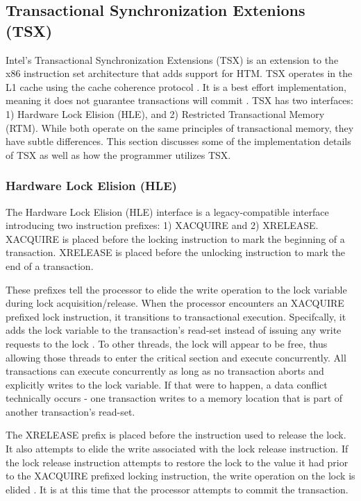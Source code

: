\documentclass[a4paper]{article}
\begin{document}
\subsection{\textbf{Transactional Synchronization Extenions (TSX)}}

\indent
Intel's Transactional Synchronization Extensions (TSX) is an extension
to the x86 instruction set architecture that adds support for HTM.  TSX operates
in the L1 cache using the cache coherence protocol \cite{intel_opt_man}.  It is
a best effort implementation, meaning it does not guarantee transactions will
commit \cite{intel_prog_ref}.  TSX has two interfaces: 1) Hardware Lock Elision
(HLE), and 2) Restricted Transactional Memory (RTM).  While both operate on the
same principles of transactional memory, they have subtle differences.  This
section discusses some of the implementation details of TSX as well as how the
programmer utilizes TSX.
\par

\subsubsection{\textbf{Hardware Lock Elision (HLE)}}

\indent 
The Hardware Lock Elision (HLE) interface is a legacy-compatible
interface introducing two instruction prefixes: 1) XACQUIRE and 2) XRELEASE.
XACQUIRE is placed before the locking instruction to mark the beginning of a
transaction.  XRELEASE is placed before the unlocking instruction to mark the
end of a transaction.
\par

\indent 
These prefixes tell the processor to elide the write operation to the lock
variable during lock acquisition/release.  When the processor encounters an
XACQUIRE prefixed lock instruction, it transitions to transactional execution.
Specifcally, it adds the lock variable to the transaction's read-set instead of
issuing any write requests to the lock \cite{intel_prog_ref}.  To other threads,
the lock will appear to be free, thus allowing those threads to enter the
critical section and execute concurrently.  All transactions can execute
concurrently as long as no transaction aborts and explicitly writes to the lock
variable.  If that were to happen, a data conflict technically occurs - one
transaction writes to a memory location that is part of another transaction's
read-set.
\par

\indent 
The XRELEASE prefix is placed before the instruction used to release the
lock.  It also attempts to elide the write associated with the lock release
instruction.  If the lock release instruction attempts to restore the lock to the
value it had prior to the XACQUIRE prefixed locking instruction, the write
operation on the lock is elided \cite{intel_prog_ref}.  It is at this time that
the processor attempts to commit the transaction.
\par
\end{document}
